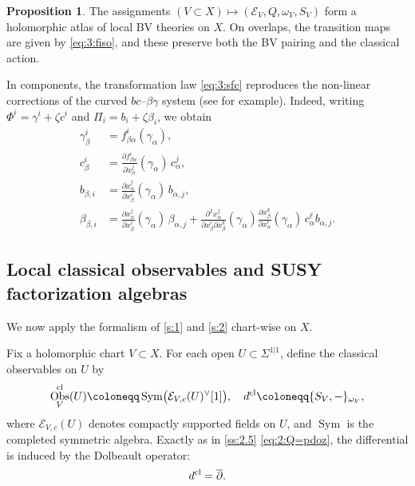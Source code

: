 \documentclass[final,reqno]{amsart}
\numberwithin{equation}{section}
\theoremstyle{definition}
\newtheorem{prp}[thm]{Proposition}
\newcommand{\ceq}{\coloneqq} %
\newcommand{\mto}{\mapsto}
\newcommand{\tcl}{\textup{cl}}
\newcommand{\clE}{\mathcal{E}}
\newcommand{\pd}{\partial}
\newcommand{\bpd}{\overline{\partial}}
\newcommand{\sSig}{\Sigma^{1|1}}
\newcommand{\cObs}[1]{\mathop{\Obs^{\textup{cl}}_{#1}}}
\DeclareMathOperator{\Sym}{Sym}
\DeclareMathOperator{\Obs}{Obs}
\begin{document}
\begin{prp}\label{prp:3:cgl}
The assignments $(V \subset X) \mto (\clE_V,Q,\omega_V,S_V)$
form a holomorphic atlas of local BV theories on $X$. 
On overlaps, the transition maps are given by \eqref{eq:3:fiso}, 
and these preserve both the BV pairing and the classical action.
\end{prp}


In components, the transformation law \eqref{eq:3:sfc} reproduces 
the non-linear corrections of the curved $bc$--$\beta\gamma$ system
(see \cite[\S3.5]{MSV} for example). 
Indeed, writing $\Phi^i=\gamma^i+\zeta c^i$ 
and $\Pi_i=b_i+\zeta \beta_i$, we obtain
\begin{align*}
 \gamma^i_\beta &=
 f^i_{\beta\alpha}(\gamma_\alpha), \\
 c^i_\beta &=
 \frac{\pd f^i_{\beta\alpha}}{\pd x^j_\alpha}(\gamma_\alpha)\,c^j_\alpha, \\
 b_{\beta,i} &=
 \frac{\pd x^j_\alpha}{\pd x^i_\beta}(\gamma_\alpha)\,b_{\alpha,j}, \\
 \beta_{\beta,i} &=
 \frac{\pd x^j_\alpha}{\pd x^i_\beta}(\gamma_\alpha)\,\beta_{\alpha,j} +
 \frac{\pd^2x^j_\alpha}{\pd x^i_\beta\pd x^{k}_\beta}(\gamma_\alpha)
 \frac{\pd x^{k}_\beta}{\pd x^{\ell}_\alpha}(\gamma_\alpha)\,
 c^{\ell}_\alpha b_{\alpha,j}.
\end{align*}

\subsection{Local classical observables and SUSY factorization algebras}
\label{ss:3.3}

We now apply the formalism of \cref{s:1} and \cref{s:2} chart-wise on $X$.

Fix a holomorphic chart $V \subset X$. 
For each open $U \subset \sSig$, define the classical observables on $U$ by
\begin{align*}
 \cObs{V}(U) \ceq \Sym\bigl(\clE_{V,c}(U)^{\vee}[1]\bigr), \quad
 d^{\tcl} \ceq \{S_V,-\}_{\omega_V},
\end{align*}
where $\clE_{V,c}(U)$ denotes compactly supported fields on $U$, 
and $\Sym$ is the completed symmetric algebra. 
Exactly as in \cref{ss:2.5} \eqref{eq:2:Q=pdoz}, 
the differential is induced by the Dolbeault operator:
\[
 d^{\tcl} = \bpd.
\]
\end{document}
